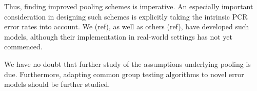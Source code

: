 \documentclass{article}
\begin{document}
Thus, finding improved pooling schemes is imperative. An especially
important consideration in designing such schemes is explicitly taking
the intrinsic PCR error rates into account. We (ref), as well as
others (ref), have developed such models, although their
implementation in real-world settings has not yet commenced.

We have no doubt that further study of the assumptions underlying
pooling is due. Furthermore, adapting common group testing algorithms
\cite{Kim} to novel error models should be further studied.










\end{document}
